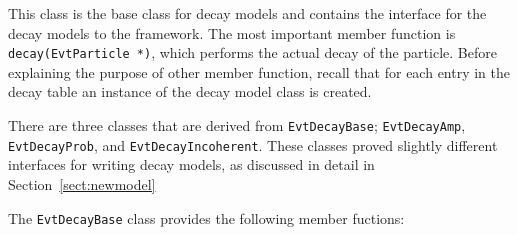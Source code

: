 This class is the base class for decay models and contains the interface
for the decay models to the framework. The most important member
function is {\tt decay(EvtParticle *)}, which performs the actual 
decay of the particle. 
Before explaining the purpose of other
member function, recall that for each entry in the decay table
an instance of the decay model class is created. 


There are three classes that are derived from {\tt EvtDecayBase};
{\tt EvtDecayAmp}, {\tt EvtDecayProb}, 
and {\tt EvtDecayIncoherent}. These classes proved slightly
different interfaces for writing decay models, as discussed in 
detail in Section~\ref{sect:newmodel}

The {\tt EvtDecayBase} class provides the following
member fuctions:


